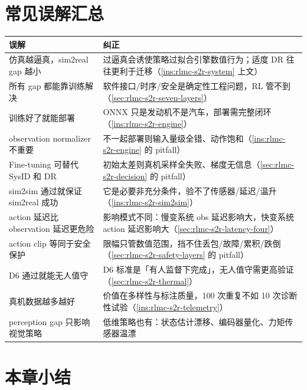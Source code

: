 \section{常见误解汇总}
\label{sec:rlmc-s2r-misconceptions}

\begin{center}
\small
\begin{tabular}{@{}p{5.0cm}p{7.0cm}@{}}
\toprule
误解 & 纠正 \\
\midrule
仿真越逼真，sim2real gap 越小 & 过逼真会诱使策略过拟合引擎数值行为；适度 DR 往往更利于迁移（\cref{ins:rlmc-s2r-system} 上文） \\
所有 gap 都能靠训练解决 & 软件接口/时序/安全是确定性工程问题，RL 管不到（\cref{sec:rlmc-s2r-seven-layers}） \\
训练好了就能部署 & ONNX 只是发动机不是汽车，部署需完整闭环（\cref{ins:rlmc-s2r-engine}） \\
observation normalizer 不重要 & 不一起部署则输入量级全错、动作饱和（\cref{ins:rlmc-s2r-engine} 的 pitfall） \\
Fine-tuning 可替代 SysID 和 DR & 初始太差则真机采样全失败、梯度无信息（\cref{sec:rlmc-s2r-decision} 的 pitfall） \\
sim2sim 通过就保证 sim2real 成功 & 它是必要非充分条件，验不了传感器/延迟/温升（\cref{ins:rlmc-s2r-sim2sim}） \\
action 延迟比 observation 延迟更危险 & 影响模式不同：慢变系统 obs 延迟影响大，快变系统 action 延迟影响大（\cref{sec:rlmc-s2r-latency-four}） \\
action clip 等同于安全保护 & 限幅只管数值范围，挡不住丢包/故障/累积/跌倒（\cref{sec:rlmc-s2r-safety-layers} 的 pitfall） \\
D6 通过就能无人值守 & D6 标准是「有人监督下完成」，无人值守需更高验证（\cref{sec:rlmc-s2r-thermal}） \\
真机数据越多越好 & 价值在多样性与标注质量，100 次重复不如 10 次诊断性试验（\cref{ins:rlmc-s2r-telemetry}） \\
perception gap 只影响视觉策略 & 低维策略也有：状态估计漂移、编码器量化、力矩传感器温漂 \\
\bottomrule
\end{tabular}
\end{center}

\section*{本章小结}
\label{sec:rlmc-s2r-summary}

